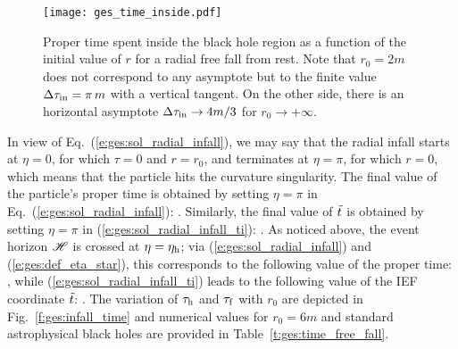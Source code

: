 \begin{figure}
\centerline{\texttt{[image: ges\_time\_inside.pdf]}}
\caption[]{\label{f:ges:time_inside} \footnotesize
Proper time spent inside the black hole region as a function
of the initial value of $r$ for a radial free fall from rest.
Note that $r_0=2m$ does not correspond to any asymptote but to the
finite value $\Delta\tau_{\rm in} = \pi\, m$ with a vertical tangent.
On the other side, there is an horizontal asymptote
$\Delta\tau_{\rm in} \rightarrow 4m/3$ for $r_0\rightarrow +\infty$.}
\end{figure}

In view of Eq.~(\ref{e:ges:sol_radial_infall}), we may say that the radial
infall starts at $\eta=0$, for which $\tau=0$ and $r=r_0$, and terminates
at $\eta=\pi$, for which $r=0$, which means that the particle hits the curvature
singularity. The final value of the particle's proper time is obtained by
setting $\eta=\pi$ in Eq.~(\ref{e:ges:sol_radial_infall}):
\be
     .
\ee
Similarly, the final value of ${\tilde t}$ is obtained by setting $\eta=\pi$ in (\ref{e:ges:sol_radial_infall_ti}):
\be
     .
\ee
As noticed above, the event horizon $\mathscr{H}$ is crossed at $\eta=\eta_{\rm h}$;
via (\ref{e:ges:sol_radial_infall}) and (\ref{e:ges:def_eta_star}), this corresponds to the following value
of the proper time:
\be
     ,
\ee
while (\ref{e:ges:sol_radial_infall_ti}) leads to the following value
of the IEF coordinate ${\tilde t}$:
\be
     .
\ee
The variation of $\tau_{\rm h}$ and $\tau_{\rm f}$ with $r_0$ are depicted in
Fig.~\ref{f:ges:infall_time} and numerical values for $r_0=6m$ and
standard astrophysical black holes are provided in
Table~\ref{t:ges:time_free_fall}.

